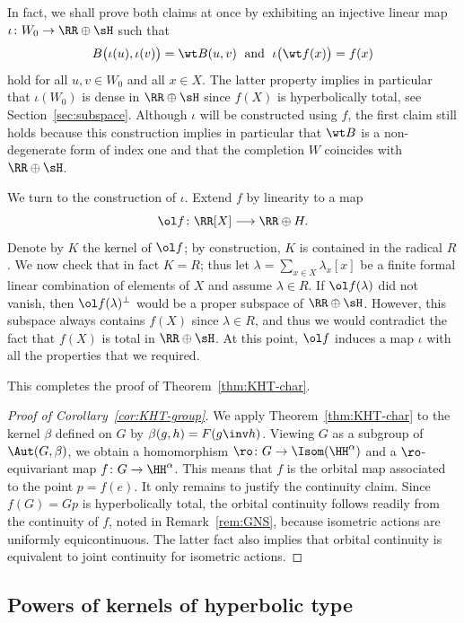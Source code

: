 In fact, we shall prove both claims at once by exhibiting an injective linear map $\iota\colon W_0 \to \RR\oplus\sH$ such that
\[
B\big(\iota(u), \iota(v)\big) = \wt B(u,v) \; \text{ and }\; \iota\big(\wt f(x)\big) = f(x)
\]
hold for all $u,v\in W_0$ and all $x\in X$. The latter property implies in particular that $\iota(W_0)$ is dense in $\RR\oplus\sH$ since $f(X)$ is hyperbolically total, see Section~\ref{sec:subspace}. Although $\iota$ will be constructed using $f$, the first claim still holds because this construction implies in particular that $\wt B$ is a non-degenerate form of index one and that the completion $W$ coincides with $\RR\oplus\sH$.

We turn to the construction of $\iota$. Extend $f$ by linearity to a map
\[
\ol f\colon\RR[X] \longrightarrow \RR\oplus H.
\]
Denote by $K$ the kernel of $\ol f$; by construction, $K$ is contained in the radical $R$. We now check that in fact $K=R$; thus let $\lambda = \sum_{x\in X} \lambda_x [x]$ be a finite formal linear combination of elements of $X$ and assume $\lambda\in R$. If $\ol f(\lambda)$ did not vanish, then $\ol f(\lambda)^\perp$ would be a proper subspace of $\RR\oplus\sH$. However, this subspace always contains $f(X)$ since $\lambda\in R$, and thus we would contradict the fact that $f(X)$ is total in $\RR\oplus\sH$. At this point, $\ol f$ induces a map $\iota$ with all the properties that we required.

This completes the proof of Theorem~\ref{thm:KHT-char}.%

\begin{proof}[Proof of Corollary~\ref{cor:KHT-group}]
We apply Theorem~\ref{thm:KHT-char} to the kernel $\beta$ defined on $G$ by $\beta(g,h)= F(g\inv h)$. Viewing $G$ as a subgroup of $\Aut(G,\beta)$, we obtain a homomorphism $\ro\colon G\to \Isom(\HH^\alpha)$ and a $\ro$-equivariant map $f\colon G\to \HH^\alpha$. This means that $f$ is the orbital map associated to the point $p=f(e)$. It only remains to justify the continuity claim. Since $f(G)=G p$ is hyperbolically total, the orbital continuity follows readily from the continuity of $f$, noted in Remark~\ref{rem:GNS}, because isometric actions are uniformly equicontinuous. The latter fact also implies that orbital continuity is equivalent to joint continuity for isometric actions.
\end{proof}

\subsection{Powers of kernels of hyperbolic type}

